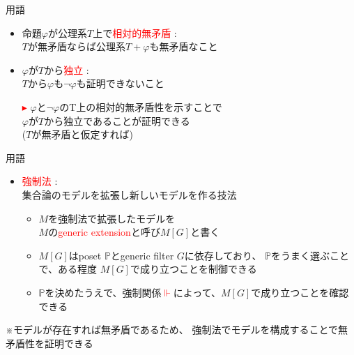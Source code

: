 \documentclass[17pt]{beamer}
\newcommand{\Pbb}{\mathbb{P}}
\begin{document}
\begin{frame}{用語}\,
    \vspace{-20pt}
    {\small 
        \begin{itemize}[itemsep=8pt]
            \item 命題$\varphi$が公理系$T$上で\textcolor{red}{相対的無矛盾} :\\
            $T$が無矛盾ならば公理系$T+\varphi$も無矛盾なこと
            \item $\varphi$が$T$から\textcolor{red}{独立} : \\
            $T$から$\varphi$も$\neg\varphi$も証明できないこと   
        \end{itemize}

        \begin{itemize}
            \item [\textcolor{red}{$\blacktriangleright$}]
            $\varphi$と$\neg\varphi$のT上の相対的無矛盾性を示すことで\\
            $\varphi$が$T$から独立であることが証明できる\\
            ($T$が無矛盾と仮定すれば)
        \end{itemize}
    }
\end{frame}

\begin{frame}{用語}\,
    \vspace{-45pt}
    
    {\small 
    \begin{itemize}[itemsep=8pt]
        \item \textcolor{red}{強制法} : \\
        集合論のモデルを拡張し新しいモデルを作る技法
        \begin{itemize}
            \item $M$を強制法で拡張したモデルを\\$M$の\textcolor{red}{generic extension}と呼び$M[G]$と書く
            \item $M[G]$はposet $\Pbb$とgeneric filter $G$に依存しており、
            $\Pbb$をうまく選ぶことで、ある程度
            $M[G]$で成り立つことを制御できる
            \item $\Pbb$を決めたうえで、強制関係\textcolor{red}{$\Vdash$}によって、$M[G]$で成り立つことを確認できる
        \end{itemize}
    \end{itemize}
    \vspace{-15pt}
    ※モデルが存在すれば無矛盾であるため、
    強制法でモデルを構成することで無矛盾性を証明できる
}
\end{frame}
\end{document}
